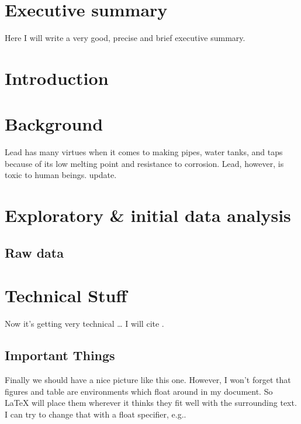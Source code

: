 \documentclass[11pt,twoside]{article}
\numberwithin{Theorem}{section}
\numberwithin{Definition}{section}
\numberwithin{Lemma}{section}
\numberwithin{Algorithm}{section}
\numberwithin{equation}{section}
\begin{document}
\setcounter{page}{1}


\clearpage

\section*{Executive summary}
\label{sec.intro}

Here I will write a very good, precise and brief executive summary.
\clearpage

\section{Introduction}
\label{sec.intro}

\clearpage

\section{Background}
\label{sec:background}
Lead has many virtues when it comes to making pipes, water tanks, and
taps because of its low melting point and resistance to corrosion.
Lead, however, is toxic to human beings. update.

\clearpage

\section{Exploratory \& initial data analysis}
\label{sec.explore}

\subsection{Raw data}
\label{sec:raw}



\clearpage

\section{Technical Stuff}

Now it's getting very technical \ldots{} I will cite \cite{shiina} \cite{groewe2001}.

\subsection{Important Things}
Finally we should have a nice picture like this one.
However, I won't forget that figures and table are environments which float around in my document.
So LaTeX will place them wherever it thinks they fit well with the surrounding text.
I can try to change that with a float specifier, e.g..
\end{document}
